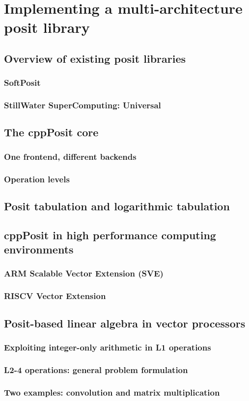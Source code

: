 \chapter{Implementing a multi-architecture posit library}
\section{Overview of existing posit libraries}
\subsection{SoftPosit}
\subsection{StillWater SuperComputing: Universal}

\section{The cppPosit core}
\subsection{One frontend, different backends}
\subsection{Operation levels}

\section{Posit tabulation and logarithmic tabulation}

\section{cppPosit in high performance computing environments}
\subsection{ARM Scalable Vector Extension (SVE)}
\subsection{RISCV Vector Extension}

\section{Posit-based linear algebra in vector processors}
\subsection{Exploiting integer-only arithmetic in L1 operations}
\subsection{L2-4 operations: general problem formulation}
\subsection{Two examples: convolution and matrix multiplication}

